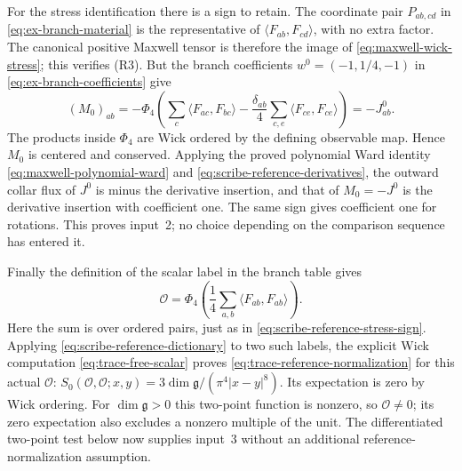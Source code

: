 For the stress identification there is a sign to retain. The coordinate
pair $P_{ab,cd}$ in \eqref{eq:ex-branch-material} is the representative
of $\langle F_{ab},F_{cd}\rangle$, with no extra factor. The canonical
positive Maxwell tensor is therefore the image of
\eqref{eq:maxwell-wick-stress}; this verifies (R3). But the branch
coefficients $w^0=(-1,1/4,-1)$ in \eqref{eq:ex-branch-coefficients} give
\begin{equation}\label{eq:scribe-reference-stress-sign}
 (M_0)_{ab}=-\Phi_4\left(
   \sum_c\langle F_{ac},F_{bc}\rangle
      -\frac{\delta_{ab}}4\sum_{c,e}
                         \langle F_{ce},F_{ce}\rangle\right)=-J^0_{ab}.
\end{equation}
The products inside $\Phi_4$ are Wick ordered by the defining observable
map. Hence $M_0$ is centered and conserved. Applying the proved
polynomial Ward identity \eqref{eq:maxwell-polynomial-ward} and
\eqref{eq:scribe-reference-derivatives}, the outward collar flux of
$J^0$ is minus the derivative insertion, and that of $M_0=-J^0$ is
the derivative insertion with coefficient one. The same sign gives
coefficient one for rotations. This proves input~2; no choice depending
on the comparison sequence has entered it.

Finally the definition of the scalar label in the branch table gives
\begin{equation}\label{eq:scribe-reference-scalar-identification}
 \mathcal O=\Phi_4\left(\frac14\sum_{a,b}
                                  \langle F_{ab},F_{ab}\rangle\right).
\end{equation}
Here the sum is over ordered pairs, just as in
\eqref{eq:scribe-reference-stress-sign}. Applying
\eqref{eq:scribe-reference-dictionary} to two such labels, the explicit
Wick computation \eqref{eq:trace-free-scalar} proves
\eqref{eq:trace-reference-normalization} for this actual $\mathcal O$:
$S_0(\mathcal O,\mathcal O;x,y)=3\dim\mathfrak g/(\pi^4|x-y|^8)$.
Its expectation is zero by Wick ordering. For $\dim\mathfrak g>0$
this two-point function is nonzero, so $\mathcal O\ne0$; its zero
expectation also excludes a nonzero multiple of the unit. The
differentiated two-point test below now supplies input~3 without an
additional reference-normalization assumption.

